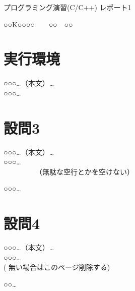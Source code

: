 \documentclass[11pt]{jsarticle}     %
\begin{document}
\noindent
\begin{large}
プログラミング演習(C/C++) レポート1
\end{large}

\begin{flushright}
○○K○○○○　　○○　○○
\end{flushright}

\section*{実行環境}

○○○…（本文）…　\\
○○○… \\

\section*{設問3}

○○○…（本文）…　\\
○○○… \\
　　　　　（無駄な空行とかを空けない） \\





\vfill %


○○○… \\
\newpage

\section*{設問4}

○○○…（本文）… \\
○○○… \\

( 無い場合はこのページ削除する)




\vfill






○○…
\end{document}
